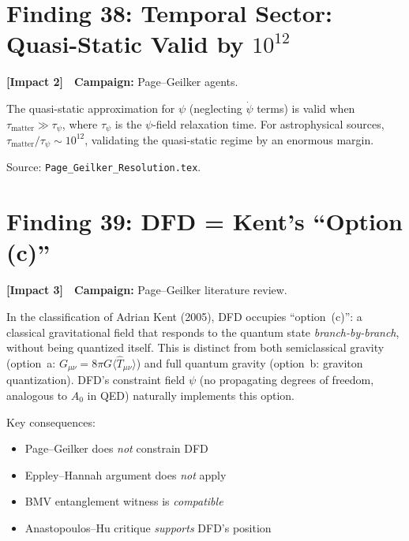 \documentclass[11pt,a4paper]{article}
\newcommand{\impactthree}{\textcolor{impact3}{\textbf{[Impact 3]}}}
\newcommand{\impacttwo}{\textcolor{impact2}{\textbf{[Impact 2]}}}
\begin{document}
\section{Finding 38: Temporal Sector: Quasi-Static Valid by $10^{12}$}
\label{sec:quasi-static}

\impacttwo\ \ \textbf{Campaign:} Page--Geilker agents.

The quasi-static approximation for $\psi$ (neglecting $\dot\psi$ terms)
is valid when $\tau_{\mathrm{matter}} \gg \tau_\psi$, where $\tau_\psi$
is the $\psi$-field relaxation time. For astrophysical sources,
$\tau_{\mathrm{matter}}/\tau_\psi \sim 10^{12}$, validating the
quasi-static regime by an enormous margin.

Source: \texttt{Page\_Geilker\_Resolution.tex}.


\section{Finding 39: DFD = Kent's ``Option (c)''}
\label{sec:kent}

\impactthree\ \ \textbf{Campaign:} Page--Geilker literature review.

In the classification of Adrian Kent (2005), DFD occupies ``option~(c)'':
a classical gravitational field that responds to the quantum state
\emph{branch-by-branch}, without being quantized itself. This is distinct
from both semiclassical gravity (option~a: $G_{\mu\nu} = 8\pi G
\langle\hat{T}_{\mu\nu}\rangle$) and full quantum gravity (option~b:
graviton quantization). DFD's constraint field $\psi$ (no propagating
degrees of freedom, analogous to $A_0$ in QED) naturally implements
this option.

Key consequences:
\begin{itemize}[nosep]
\item Page--Geilker does \emph{not} constrain DFD
\item Eppley--Hannah argument does \emph{not} apply
\item BMV entanglement witness is \emph{compatible}
\item Anastopoulos--Hu critique \emph{supports} DFD's position
\end{itemize}
\end{document}
